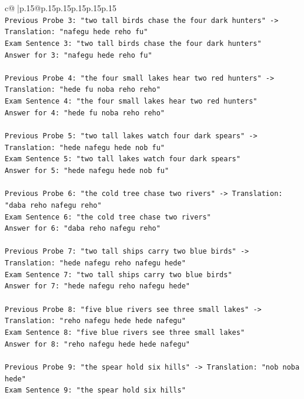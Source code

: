 \documentclass{article}
\begin{document}
{\begin{supertabular}{c@{$\;$}|p{.15\linewidth}@{}p{.15\linewidth}p{.15\linewidth}p{.15\linewidth}p{.15\linewidth}p{.15\linewidth}}
{{{\\ 
\texttt{Previous Probe 3: "two tall birds chase the four dark hunters" {-}> Translation: "nafegu hede reho fu"} \\
\texttt{Exam Sentence 3: "two tall birds chase the four dark hunters"} \\
\texttt{Answer for 3: "nafegu hede reho fu"} \\
\\ 
\texttt{Previous Probe 4: "the four small lakes hear two red hunters" {-}> Translation: "hede fu noba reho reho"} \\
\texttt{Exam Sentence 4: "the four small lakes hear two red hunters"} \\
\texttt{Answer for 4: "hede fu noba reho reho"} \\
\\ 
\texttt{Previous Probe 5: "two tall lakes watch four dark spears" {-}> Translation: "hede nafegu hede nob fu"} \\
\texttt{Exam Sentence 5: "two tall lakes watch four dark spears"} \\
\texttt{Answer for 5: "hede nafegu hede nob fu"} \\
\\ 
\texttt{Previous Probe 6: "the cold tree chase two rivers" {-}> Translation: "daba reho nafegu reho"} \\
\texttt{Exam Sentence 6: "the cold tree chase two rivers"} \\
\texttt{Answer for 6: "daba reho nafegu reho"} \\
\\ 
\texttt{Previous Probe 7: "two tall ships carry two blue birds" {-}> Translation: "hede nafegu reho nafegu hede"} \\
\texttt{Exam Sentence 7: "two tall ships carry two blue birds"} \\
\texttt{Answer for 7: "hede nafegu reho nafegu hede"} \\
\\ 
\texttt{Previous Probe 8: "five blue rivers see three small lakes" {-}> Translation: "reho nafegu hede hede nafegu"} \\
\texttt{Exam Sentence 8: "five blue rivers see three small lakes"} \\
\texttt{Answer for 8: "reho nafegu hede hede nafegu"} \\
\\ 
\texttt{Previous Probe 9: "the spear hold six hills" {-}> Translation: "nob noba hede"} \\
\texttt{Exam Sentence 9: "the spear hold six hills"} \\
}}}
\end{supertabular}}
\end{document}

